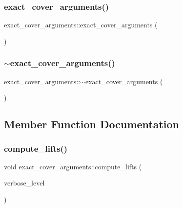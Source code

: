 \subsubsection{\texorpdfstring{exact\+\_\+cover\+\_\+arguments()}{exact\_cover\_arguments()}}
{\footnotesize\ttfamily exact\+\_\+cover\+\_\+arguments\+::exact\+\_\+cover\+\_\+arguments (\begin{DoxyParamCaption}{ }\end{DoxyParamCaption})}

\mbox{\label{classexact__cover__arguments_a30625bd3601bfb610f56c528e16a3aa7}} 
\subsubsection{\texorpdfstring{$\sim$exact\+\_\+cover\+\_\+arguments()}{~exact\_cover\_arguments()}}
{\footnotesize\ttfamily exact\+\_\+cover\+\_\+arguments\+::$\sim$exact\+\_\+cover\+\_\+arguments (\begin{DoxyParamCaption}{ }\end{DoxyParamCaption})}



\subsection{Member Function Documentation}
\mbox{\label{classexact__cover__arguments_ab0cdb09a17201c89aa9f83bd511dbbf7}} 
\subsubsection{\texorpdfstring{compute\+\_\+lifts()}{compute\_lifts()}}
{\footnotesize\ttfamily void exact\+\_\+cover\+\_\+arguments\+::compute\+\_\+lifts (\begin{DoxyParamCaption}\item[{\mbox{\hyperlink{galois_8h_a09fddde158a3a20bd2dcadb609de11dc}{I\+NT}}}]{verbose\+\_\+level }\end{DoxyParamCaption})}

